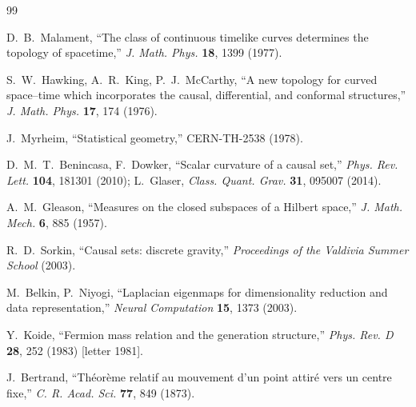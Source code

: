 \documentclass[11pt,twoside]{book}
\begin{document}
\begin{thebibliography}{99}

D.~B.~Malament, ``The class of continuous timelike curves determines the topology of
spacetime,'' \emph{J. Math. Phys.} \textbf{18}, 1399 (1977).

S.~W.~Hawking, A.~R.~King, P.~J.~McCarthy, ``A new topology for curved space--time which
incorporates the causal, differential, and conformal structures,'' \emph{J. Math. Phys.}
\textbf{17}, 174 (1976).

J.~Myrheim, ``Statistical geometry,'' CERN-TH-2538 (1978).

D.~M.~T.~Benincasa, F.~Dowker, ``Scalar curvature of a causal set,'' \emph{Phys. Rev. Lett.}
\textbf{104}, 181301 (2010); L.~Glaser, \emph{Class. Quant. Grav.} \textbf{31}, 095007
(2014).

A.~M.~Gleason, ``Measures on the closed subspaces of a Hilbert space,''
\emph{J. Math. Mech.} \textbf{6}, 885 (1957).

R.~D.~Sorkin, ``Causal sets: discrete gravity,'' \emph{Proceedings of the Valdivia Summer
School} (2003).

M.~Belkin, P.~Niyogi, ``Laplacian eigenmaps for dimensionality reduction and data
representation,'' \emph{Neural Computation} \textbf{15}, 1373 (2003).

Y.~Koide, ``Fermion mass relation and the generation structure,'' \emph{Phys. Rev. D}
\textbf{28}, 252 (1983) [letter 1981].

J.~Bertrand, ``Th\'eor\`eme relatif au mouvement d'un point attir\'e vers un centre fixe,''
\emph{C. R. Acad. Sci.} \textbf{77}, 849 (1873).

\end{thebibliography}
\end{document}
